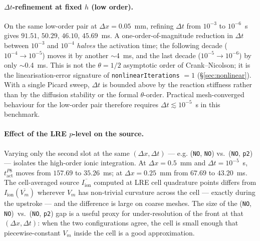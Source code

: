 \documentclass[11pt,a4paper]{article}
\newcommand{\Vm}{V_{m}}
\newcommand{\Iion}{I_{\text{ion}}}
\newcommand{\code}[1]{\texttt{\small #1}}
\begin{document}
\paragraph{$\Delta t$-refinement at fixed $h$ (low order).}
On the same low-order pair at $\Delta x = 0.05$~mm, refining
$\Delta t$ from $10^{-3}$ to $10^{-6}$~s gives $91.51,\, 50.29,\,
46.10,\, 45.69$~ms. A one-order-of-magnitude reduction in $\Delta t$
between $10^{-3}$ and $10^{-4}$ \emph{halves} the activation time; the
following decade ($10^{-4} \to 10^{-5}$) moves it by another $\sim$4~ms,
and the last decade ($10^{-5} \to 10^{-6}$) by only $\sim$0.4~ms. This
is not the $\theta = 1/2$ asymptotic order of Crank--Nicolson; it is
the linearisation-error signature of \code{nonlinearIterations} $= 1$
(\S\ref{sec:nonlinear}). With a single Picard sweep, $\Delta t$ is
bounded above by the reaction stiffness rather than by the diffusion
stability or the formal $\theta$-order. Practical mesh-converged
behaviour for the low-order pair therefore requires
$\Delta t \lesssim 10^{-5}$~s in this benchmark.

\paragraph{Effect of the LRE $p$-level on the source.}
Varying only the second slot at the same $(\Delta x, \Delta t)$ ---
e.g. (\code{NO}, \code{NO}) vs.\ (\code{NO}, \code{p2}) --- isolates
the high-order ionic integration. At
$\Delta x = 0.5$~mm and $\Delta t = 10^{-5}$~s,
$t_{\text{act}}^{P8}$ moves from $157.69$ to $35.26$~ms; at
$\Delta x = 0.25$~mm from $67.69$ to $43.20$~ms. The cell-averaged
source $\overline{\Iion}$ computed at LRE cell quadrature points
differs from $\Iion(\overline{\Vm})$ wherever $\Vm$ has non-trivial
curvature across the cell --- exactly during the upstroke --- and the
difference is large on coarse meshes. The size of the
(\code{NO}, \code{NO})~vs.~(\code{NO}, \code{p2}) gap is a useful
proxy for under-resolution of the front at that $(\Delta x,\Delta t)$:
when the two configurations agree, the cell is small enough that
piecewise-constant $\Vm$ inside the cell is a good approximation.
\end{document}
